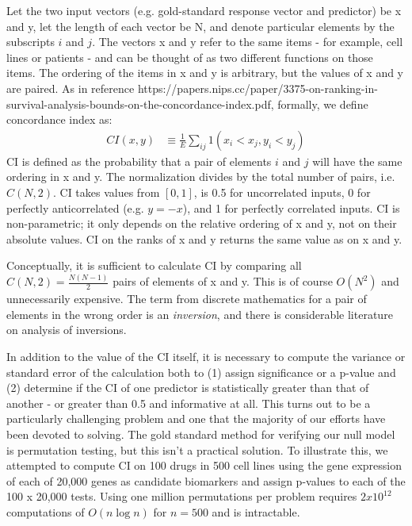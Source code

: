 \documentclass{article}
\begin{document}
Let the two input vectors (e.g. gold-standard response vector and predictor) be x and y, let the length of each vector be N, and denote particular elements by the subscripts $i$ and $j$.  The vectors x and y refer to the same items - for example, cell lines or patients - and can be thought of as two different functions on those items.  The ordering of the items in x and y is arbitrary, but the values of x and y are paired.  As in reference https://papers.nips.cc/paper/3375-on-ranking-in-survival-analysis-bounds-on-the-concordance-index.pdf, formally, we define concordance index as:
\begin{align}
CI(x,y) &\equiv \frac{1}{E}\sum_{ij}1(x_{i} < x_{j}, y_{i} < y_{j})
\end{align}
CI is defined as the probability that a pair of elements $i$ and $j$ will have the same ordering in x and y.  The normalization divides by the total number of pairs, i.e. $C(N,2)$.  CI takes values from $[0,1]$, is 0.5 for uncorrelated inputs, 0 for perfectly anticorrelated (e.g. $y = -x$), and 1 for perfectly correlated inputs.  CI is non-parametric; it only depends on the relative ordering of x and y, not on their absolute values.  CI on the ranks of x and y returns the same value as on x and y. 

Conceptually, it is sufficient to calculate CI by comparing all $C(N,2) = \frac{N(N-1)}{2}$ pairs of elements of x and y.  This is of course $O(N^{2})$ and unnecessarily expensive.  The term from discrete mathematics for a pair of elements in the wrong order is an \textit{inversion}, and there is considerable literature on analysis of inversions.  

In addition to the value of the CI itself, it is necessary to compute the variance or standard error of the calculation both to (1) assign significance or a p-value and (2) determine if the CI of one predictor is statistically greater than that of another - or greater than 0.5 and informative at all.  This turns out to be a particularly challenging problem and one that the majority of our efforts have been devoted to solving.  The gold standard method for verifying our null model is permutation testing, but this isn't a practical solution.  To illustrate this, we attempted to compute CI on 100 drugs in 500 cell lines using the gene expression of each of 20,000 genes as candidate biomarkers and assign p-values to each of the 100 x 20,000 tests.  Using one million permutations per problem requires $2x10^{12}$ computations of $O(n \log n)$ for $n=500$ and is intractable.  
\end{document}
